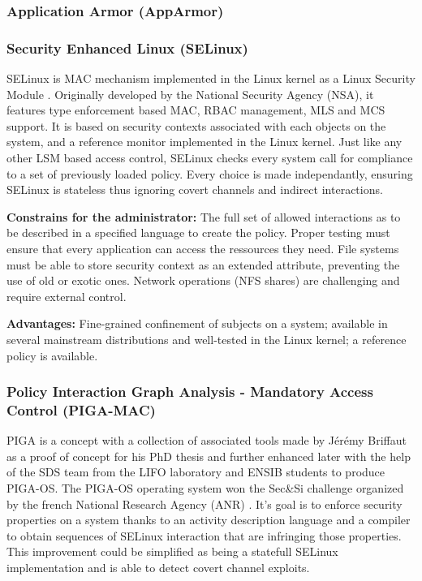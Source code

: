 \documentclass[pdftex,a4paper,titlepage,11pt]{article}
\begin{document}
\subsubsection{Application Armor (AppArmor)}
\subsubsection{Security Enhanced Linux (SELinux)}

SELinux is MAC mechanism implemented in the Linux kernel as a Linux Security
Module \cite{lsm2002linux}. Originally developed by the National Security
Agency (NSA), it features type enforcement based MAC, RBAC management, MLS and
MCS support. It is based on security contexts associated with each objects on
the system, and a reference monitor implemented in the Linux kernel. Just like
any other LSM based access control, SELinux checks every system call for
compliance to a set of previously loaded policy. Every choice is made
independantly, ensuring SELinux is stateless thus ignoring covert channels and
indirect interactions.

\begin{list}{}{}
 \item \textbf{Constrains for the administrator:} The full set of allowed
interactions as to be described in a specified language to create the policy.
Proper testing must ensure that every application can access the ressources
they need. File systems must be able to store security context as an extended
attribute, preventing the use of old or exotic ones. Network operations (NFS
shares) are challenging and require external control.
 \item \textbf{Advantages:} Fine-grained confinement of subjects on a
system; available in several mainstream distributions and well-tested in the
Linux kernel; a reference policy is available.
\end{list}

\subsubsection{Policy Interaction Graph Analysis - Mandatory Access Control
(PIGA-MAC)}

PIGA is a concept with a collection of associated tools made by Jérémy Briffaut
as a proof of concept for his PhD thesis and further enhanced later with the
help of the SDS team from the LIFO laboratory and ENSIB students to produce
PIGA-OS. The PIGA-OS operating system won the Sec\&Si challenge organized by
the french National Research Agency (ANR) \cite{pigaosdefisecurite2011}
\cite{pigaproperty2010}. It's goal is to enforce security properties on a system
thanks to an activity description language and a compiler to obtain sequences of
SELinux interaction that are infringing those properties. This improvement could
be simplified as being a statefull SELinux implementation and is able to detect
covert channel exploits.
\end{document}
